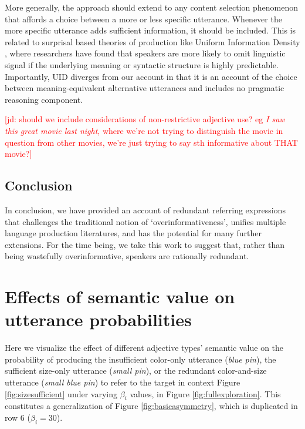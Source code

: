 \documentclass[11pt]{article}
\newcommand{\jd}[1]{\textcolor{Red}{[jd: #1]}}
\newcommand{\figref}[1]{Figure \ref{#1}}
\begin{document}
More generally, the approach should extend to any content selection phenomenon that affords a choice between a more or less specific utterance. Whenever the more specific utterance adds sufficient information, it should be included. This is related to surprisal based theories of production like Uniform Information Density \cite<UID,>{jaeger2006, levy2007, frank2008, jaeger2010}, where researchers have found that speakers are more likely to omit linguistic signal if the underlying meaning or syntactic structure is highly predictable. Importantly, UID diverges from our account in that it is an account of the choice between meaning-equivalent alternative utterances and includes no pragmatic reasoning component. 


\jd{should we include considerations of non-restrictive adjective use? eg \emph{I saw this great movie last night}, where we're not trying to distinguish the movie in question from other movies, we're just trying to say sth informative about THAT movie?}

\subsection{Conclusion}
\label{sec:conclusion}

In conclusion, we have provided an account of redundant referring expressions that challenges the traditional notion of `overinformativeness', unifies multiple language production literatures, and has the potential for many further extensions. For the time being, we take this work to suggest that, rather than being wastefully overinformative, speakers are rationally redundant.


\appendix

\section{Effects of semantic value on utterance probabilities}
\label{app:modelexploration}

Here we visualize the effect of different adjective types' semantic value on the probability of producing the insufficient color-only utterance (\emph{blue pin}), the sufficient size-only utterance (\emph{small pin}), or the redundant color-and-size utterance  (\emph{small blue pin}) to refer to the target in context \figref{fig:sizesufficient} under varying $\beta_i$ values, in \figref{fig:fullexploration}. This constitutes a generalization of \figref{fig:basicasymmetry}, which is duplicated in row 6 ($\beta_i = 30$).
\end{document}
